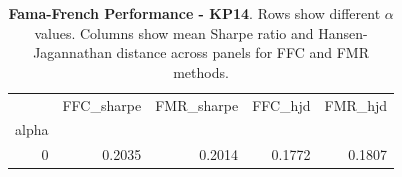 \begin{table}[h]
\centering
\begin{tabular}{rrrrr}
\toprule
 & FFC_sharpe & FMR_sharpe & FFC_hjd & FMR_hjd \\
alpha &  &  &  &  \\
\midrule
0 & 0.2035 & 0.2014 & 0.1772 & 0.1807 \\
\bottomrule
\end{tabular}
\caption{\textbf{Fama-French Performance - KP14}.
    Rows show different $\alpha$ values. Columns show mean Sharpe ratio and
    Hansen-Jagannathan distance across panels for FFC and FMR methods.}
\label{tab:fama_kp14}

\end{table}